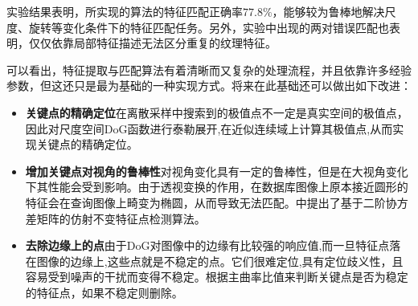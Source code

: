 实验结果表明，所实现的\sift 算法的特征匹配正确率$77.8\%$，能够较为鲁棒地解决尺度、旋转等变化条件下的特征匹配任务。另外，实验中出现的两对错误匹配也表明，仅仅依靠局部特征描述无法区分重复的纹理特征。

可以看出，\sift 特征提取与匹配算法有着清晰而又复杂的处理流程，并且依靠许多经验参数，但这还只是最为基础的一种实现方式。将来在此基础还可以做出如下改进：
\begin{itemize}
    \item \textbf{关键点的精确定位}\quad 在离散采样中搜索到的极值点不一定是真实空间的极值点，因此对尺度空间DoG函数进行泰勒展开,在近似连续域上计算其极值点,从而实现关键点的精确定位。
    \item \textbf{增加关键点对视角的鲁棒性}\quad 对视角变化具有一定的鲁棒性，但是在大视角变化下其性能会受到影响。由于透视变换的作用，在数据库图像上原本接近圆形的特征会在查询图像上畸变为椭圆，从而导致无法匹配。\cite{mikolajczyk2004scale}中提出了基于二阶协方差矩阵的仿射不变特征点检测算法。
    \item \textbf{去除边缘上的点}\quad 由于DoG对图像中的边缘有比较强的响应值,而一旦特征点落在图像的边缘上,这些点就是不稳定的点。它们很难定位,具有定位歧义性，且容易受到噪声的干扰而变得不稳定。根据主曲率比值来判断关键点是否为稳定的特征点，如果不稳定则删除。
\end{itemize}
